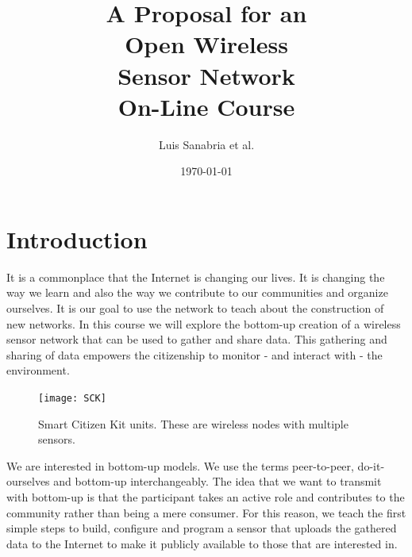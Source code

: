 \documentclass[oneside]{book}   %
\begin{document}
\title{A Proposal for an \\ Open Wireless \\ Sensor Network \\On-Line Course} %
\author{Luis Sanabria et al.} %
\date{\today}    %
\maketitle





\maketitle %

\chapter{Introduction} %

It is a commonplace that the Internet is changing our lives.
It is changing the way we learn and also the way we contribute to our communities and organize ourselves.
It is our goal to use the network to teach about the construction of new networks.
In this course we will explore the bottom-up creation of a wireless sensor network that can be used to gather and share data.
This gathering and sharing of data empowers the citizenship to monitor - and interact with - the environment.

\begin{figure}
\begin{center}
\texttt{[image: SCK]}
\caption{Smart Citizen Kit units. These are wireless nodes with multiple sensors.}
\label{fig:SCK}
\end{center}
\end{figure}

We are interested in bottom-up models.
We use the terms peer-to-peer, do-it-ourselves and bottom-up interchangeably.
The idea that we want to transmit with bottom-up is that the participant takes an active role and contributes to the community rather than being a mere consumer.
For this reason, we teach the first simple steps to build, configure and program a sensor that uploads the gathered data to the Internet to make it publicly available to those that are interested in.

\end{document}
